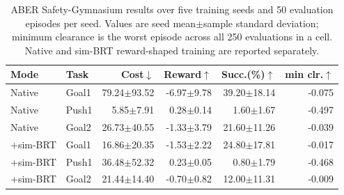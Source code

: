 \begin{table}[t]
\centering
\scriptsize
\setlength{\tabcolsep}{2.0pt}
\begin{tabular}{llrrrr}
\toprule
Mode & Task & Cost$\downarrow$ & Reward$\uparrow$ & Succ.(\%)$\uparrow$ & min clr.$\uparrow$\\
\midrule
Native & Goal1 & 79.24$\pm$93.52 & -6.97$\pm$9.78 & 39.20$\pm$18.14 & -0.075\\
Native & Push1 & 5.85$\pm$7.91 & 0.28$\pm$0.14 & 1.60$\pm$1.67 & -0.497\\
Native & Goal2 & 26.73$\pm$40.55 & -1.33$\pm$3.79 & 21.60$\pm$11.26 & -0.039\\
\midrule
+sim-BRT & Goal1 & 16.86$\pm$20.35 & -1.53$\pm$2.22 & 24.80$\pm$17.81 & -0.017\\
+sim-BRT & Push1 & 36.48$\pm$52.32 & 0.23$\pm$0.05 & 0.80$\pm$1.79 & -0.468\\
+sim-BRT & Goal2 & 21.44$\pm$14.40 & -0.70$\pm$0.82 & 12.00$\pm$11.31 & -0.009\\
\bottomrule
\end{tabular}
\caption{ABER Safety-Gymnasium results over five training seeds and 50
evaluation episodes per seed. Values are seed mean$\pm$sample standard
deviation; minimum clearance is the worst episode across all 250 evaluations
in a cell. Native and sim-BRT reward-shaped training are reported separately.}
\label{tab:safetygym}
\end{table}

